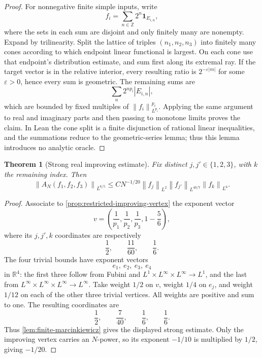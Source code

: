 \documentclass[11pt]{article}
\newtheorem{theorem}{Theorem}[section]
\newcommand{\R}{\mathbb{R}}
\newcommand{\one}{\mathbf{1}}
\newcommand{\norm}[2]{\left\lVert #1\right\rVert_{#2}}
\newcommand{\abs}[1]{\left|#1\right|}
\newcommand{\indices}{\{1,2,3\}}
\begin{document}
	\begin{proof}
		For nonnegative finite simple inputs, write
		\[
		f_i=\sum_{n\in\mathbb Z}2^n\one_{E_{i,n}},
		\]
		where the sets in each sum are disjoint and only finitely many are nonempty.  Expand by trilinearity.  Split the lattice of triples \((n_1,n_2,n_3)\) into finitely many cones according to which endpoint linear functional is largest.  On each cone use that endpoint's distribution estimate, and sum first along its extremal ray.  If the target vector is in the relative interior, every resulting ratio is \(2^{-\varepsilon |m|}\) for some \(\varepsilon>0\), hence every sum is geometric.  The remaining sums are
		\[
		\sum_n2^{np_i}\abs{E_{i,n}},
		\]
		which are bounded by fixed multiples of \(\norm{f_i}{L^{p_i}}^{p_i}\).  Applying the same argument to real and imaginary parts and then passing to monotone limits proves the claim.  In Lean the cone split is a finite disjunction of rational linear inequalities, and the summations reduce to the geometric-series lemma; thus this lemma introduces no analytic oracle.
	\end{proof}
	
	\begin{theorem}[Strong real improving estimate]\label{thm:strong-real-improving}
		Fix distinct \(j,j'\in\indices\), with \(k\) the remaining index.  Then
		\[
		\norm{A_N(f_1,f_2,f_3)}{L^{6/5}}
		\leq
		CN^{-1/20}
		\norm{f_j}{L^2}
		\norm{f_{j'}}{L^{40/7}}
		\norm{f_k}{L^6}.
		\]
	\end{theorem}
	
	\begin{proof}
		Associate to \cref{prop:restricted-improving-vertex} the exponent vector
		\[
		v=\left(\frac1{p_1},\frac1{p_2},\frac1{p_3},1-\frac56\right),
		\]
		where its \(j,j',k\) coordinates are respectively
		\[
		\frac12,\qquad\frac{11}{60},\qquad\frac16.
		\]
		The four trivial bounds have exponent vectors
		\[
		e_1,\ e_2,\ e_3,\ e_4
		\]
		in \(\R^4\): the first three follow from Fubini and
		\(L^1\times L^\infty\times L^\infty\to L^1\), and the last from
		\(L^\infty\times L^\infty\times L^\infty\to L^\infty\).
		Take weight \(1/2\) on \(v\), weight \(1/4\) on \(e_j\), and weight
		\(1/12\) on each of the other three trivial vertices.  All weights are positive and sum to one.  The resulting coordinates are
		\[
		\frac12,\qquad\frac7{40},\qquad\frac16,\qquad\frac16.
		\]
		Thus \cref{lem:finite-marcinkiewicz} gives the displayed strong estimate.  Only the improving vertex carries an \(N\)-power, so its exponent \(-1/10\) is multiplied by \(1/2\), giving \(-1/20\).
	\end{proof}
	
\end{document}
